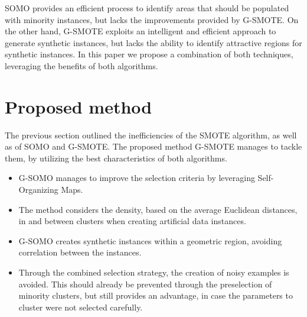 \documentclass[parskip=full]{scrartcl}
\begin{document}
SOMO provides an efficient process to identify areas that should be populated
with minority instances, but lacks the improvements provided by G-SMOTE. On the
other hand, G-SMOTE exploits an intelligent and efficient approach to generate
synthetic instances, but lacks the ability to identify attractive regions for
synthetic instances. In this paper we propose a combination of both techniques,
leveraging the benefits of both algorithms. 

\section{Proposed method}

The previous section outlined the inefficiencies of the SMOTE algorithm, as well
 as of SOMO and G-SMOTE. The proposed method G-SMOTE manages to tackle them, by
 utilizing the best characteristics of both algorithms. 

\begin{itemize} 
\item G-SOMO  manages to improve the selection criteria by leveraging
Self-Organizing Maps.
\item The method considers the density, based on the average Euclidean
	  distances, in and between clusters when creating artificial data
	  instances.
\item G-SOMO creates synthetic instances within a geometric region, avoiding
correlation between the instances.
\item Through the combined selection strategy, the creation of noisy examples is
	  avoided. This should already be prevented through the preselection of
	  minority clusters, but still provides an advantage, in case the parameters
	  to cluster were not selected carefully.
\end{itemize}
\end{document}
